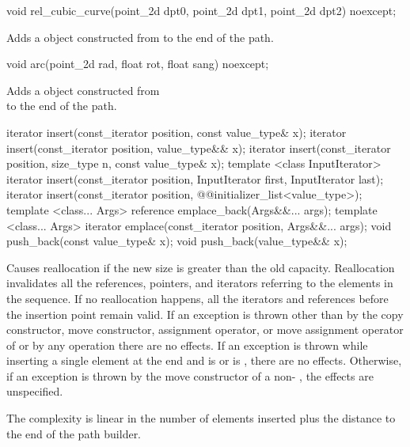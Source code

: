 %
\begin{itemdecl}
void rel_cubic_curve(point_2d dpt0, point_2d dpt1,
  point_2d dpt2) noexcept;
\end{itemdecl}
\begin{itemdescr}
\pnum
\effects
Adds a  object constructed from  to the end of the path.
\end{itemdescr}

%
\begin{itemdecl}
void arc(point_2d rad, float rot, float sang) noexcept;
\end{itemdecl}
\begin{itemdescr}
\pnum
\effects
Adds a  object constructed from \\  to the end of the path.
\end{itemdescr}

%
%
%
\begin{itemdecl}
iterator insert(const_iterator position, const value_type& x);
iterator insert(const_iterator position, value_type&& x);
iterator insert(const_iterator position, size_type n, const value_type& x);
template <class InputIterator>
iterator insert(const_iterator position, InputIterator first,
  InputIterator last);
iterator insert(const_iterator position, @\stdqualifier{}@initializer_list<value_type>);
template <class... Args>
reference emplace_back(Args&&... args);
template <class... Args>
iterator emplace(const_iterator position, Args&&... args);
void push_back(const value_type& x);
void push_back(value_type&& x);
\end{itemdecl}

\begin{itemdescr}
\pnum
\remarks
Causes reallocation if the new size is greater than the old capacity.
Reallocation invalidates all the references, pointers, and iterators
referring to the elements in the sequence.
If no reallocation happens, all the iterators and references before the insertion point remain valid.
If an exception is thrown other than by
the copy constructor, move constructor,
assignment operator, or move assignment operator of
 or by any  operation
there are no effects.
If an exception is thrown while inserting a single element at the end and
 is  or 
is , there are no effects.
Otherwise, if an exception is thrown by the move constructor of a non-
, the effects are unspecified.

\pnum
\complexity
The complexity is linear in the number of elements inserted plus the 
distance to the end of the path builder.
\end{itemdescr}

